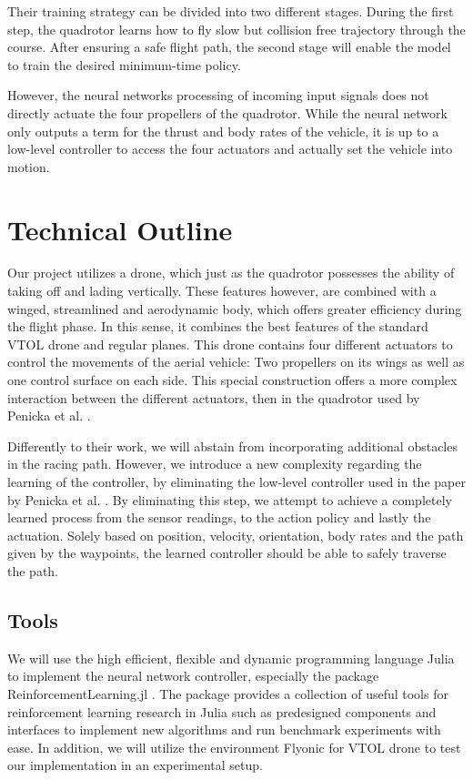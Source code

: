 \documentclass[conference]{IEEEtran}
\begin{document}
Their training strategy can be divided into two different stages. During the first step, the quadrotor learns how to fly slow but collision free trajectory through the course. After ensuring a safe flight path, the second stage will enable the model to train the desired minimum-time policy. 

However, the neural networks processing of incoming input signals does not directly actuate the four propellers of the quadrotor. While the neural network only outputs a term for the thrust and body rates of the vehicle, it is up to a low-level controller to access the four actuators and actually set the vehicle into motion. 


\section{Technical Outline}
Our project utilizes a drone, which just as the quadrotor possesses the ability of taking off and lading vertically. These features however, are combined with a winged, streamlined and aerodynamic body, which offers greater efficiency during the flight phase. In this sense, it combines the best features of the standard VTOL drone and regular planes. This drone contains four different actuators to control the movements of the aerial vehicle: Two propellers on its wings as well as one control surface on each side. This special construction offers a more complex interaction between the different actuators, then in the quadrotor used by Penicka et al. \cite{b1}.

Differently to their work, we will abstain from incorporating additional obstacles in the racing path. However, we introduce a new complexity regarding the learning of the controller, by eliminating the low-level controller used in the paper by Penicka et al. \cite{b1}. By eliminating this step, we attempt to achieve a completely learned process from the sensor readings, to the action policy and lastly the actuation. Solely based on position, velocity, orientation, body rates and the path given by the waypoints, the learned controller should be able to safely traverse the path. 

\subsection{Tools}
We will use the high efficient, flexible and dynamic programming language Julia \cite{b5} to implement the neural network controller, especially the package ReinforcementLearning.jl \cite{b6}. The package provides a collection of useful tools for reinforcement learning research in Julia such as predesigned components and interfaces to implement new algorithms and run benchmark experiments with ease.
In addition, we will utilize the environment Flyonic for VTOL drone to test our implementation in an experimental setup. 
\end{document}
